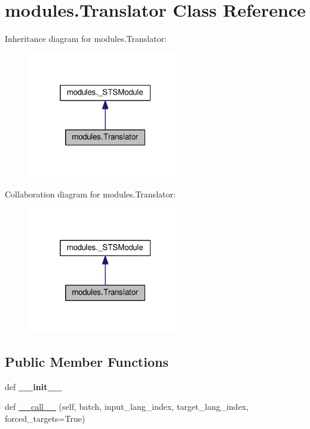 \hypertarget{classmodules_1_1Translator}{}\section{modules.\+Translator Class Reference}
\label{classmodules_1_1Translator}


Inheritance diagram for modules.\+Translator\+:
\nopagebreak
\begin{figure}[H]
\begin{center}
\leavevmode
\includegraphics[width=193pt]{classmodules_1_1Translator__inherit__graph}
\end{center}
\end{figure}


Collaboration diagram for modules.\+Translator\+:
\nopagebreak
\begin{figure}[H]
\begin{center}
\leavevmode
\includegraphics[width=193pt]{classmodules_1_1Translator__coll__graph}
\end{center}
\end{figure}
\subsection*{Public Member Functions}
\begin{DoxyCompactItemize}
\item 
def {\bfseries \+\_\+\+\_\+init\+\_\+\+\_\+}\hypertarget{classmodules_1_1Translator_a30c4a8ab7e3e28fd21441c86a30796f8}{}\label{classmodules_1_1Translator_a30c4a8ab7e3e28fd21441c86a30796f8}

\item 
def \hyperlink{classmodules_1_1Translator_a05eeb6c9ef20ae52f77ec9643a5a1922}{\+\_\+\+\_\+call\+\_\+\+\_\+} (self, batch, input\+\_\+lang\+\_\+index, target\+\_\+lang\+\_\+index, forced\+\_\+targets=True)
\end{DoxyCompactItemize}


